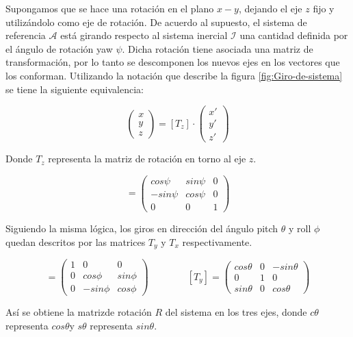 \documentclass[../main.tex]{subfiles}
\begin{document}
Supongamos que se hace una rotación en el plano $x-y$, dejando el
eje $z$ fijo y utilizándolo como eje de rotación. De acuerdo al supuesto,
el sistema de referencia $\mathcal{A}$ está girando respecto al sistema
inercial $\mathcal{I}$ una cantidad definida por el ángulo de rotación
yaw $\psi$. Dicha rotación tiene asociada una matriz de transformación, por lo tanto se descomponen los nuevos
ejes en los vectores que los conforman. Utilizando la notación que
describe la figura \ref{fig:Giro-de-sistema} se tiene la siguiente
equivalencia:

\begin{equation}
\begin{pmatrix}x\\
y\\
z
\end{pmatrix}=[T_{z}]\cdot\begin{pmatrix}x'\\
y'\\
z'
\end{pmatrix}
\end{equation}

Donde $T_{z}$ representa la matriz de rotación en torno al eje $z$. 

\begin{equation}
[T_{z}]=\begin{pmatrix}cos\psi & sin\psi & 0\\
-sin\psi & cos\psi & 0\\
0 & 0 & 1
\end{pmatrix}
\end{equation}

Siguiendo la misma lógica, los giros en dirección del ángulo pitch
$\theta$ y roll $\phi$ quedan descritos por las matrices $T_{y}$
y $T_{x}$ respectivamente.

\begin{equation}
[T_{x}]=\begin{pmatrix}1 & 0 & 0\\
0 & cos\phi & sin\phi\\
0 & -sin\phi & cos\phi
\end{pmatrix}\qquad\qquad[T_{y}]=\begin{pmatrix}cos\theta & 0 & -sin\theta\\
0 & 1 & 0\\
sin\theta & 0 & cos\theta
\end{pmatrix}
\end{equation}

Así se obtiene la matrizde rotación $R$ del sistema en los tres ejes,
donde $c\theta$ representa $cos\theta$y $s\theta$ representa $sin\theta$.
\end{document}
